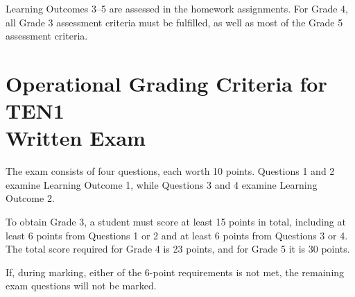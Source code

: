 \documentclass[11pt,a4paper]{article}
\begin{document}
Learning Outcomes 3--5 are assessed in the homework assignments. For Grade 4, all Grade 3 assessment criteria must be fulfilled, as well as most of the Grade 5 assessment criteria.

\newpage

\section{Operational Grading Criteria for TEN1\\Written Exam}

The exam consists of four questions, each worth 10 points. Questions 1 and 2 examine Learning Outcome 1, while Questions 3 and 4 examine Learning Outcome 2.

To obtain Grade 3, a student must score at least 15 points in total, including at least 6 points from Questions 1 or 2 and at least 6 points from Questions 3 or 4. The total score required for Grade 4 is 23 points, and for Grade 5 it is 30 points.

If, during marking, either of the 6-point requirements is not met, the remaining exam questions will not be marked.
\end{document}
